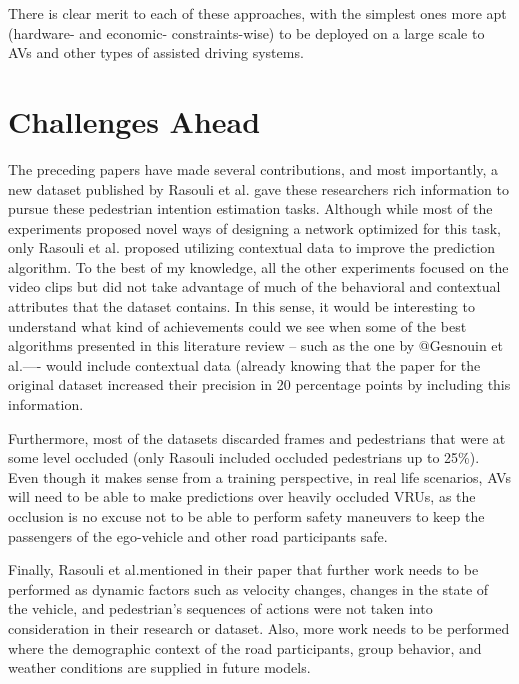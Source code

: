 \documentclass[journal,letterpaper]{IEEEtran}
\begin{document}
There is clear merit to each of these approaches, with the simplest ones more apt (hardware- and economic- constraints-wise) to be deployed on a large scale to AVs and other types of assisted driving systems.
\section{Challenges Ahead}\label{sec:challenges}
The preceding papers have made several contributions, and most importantly, a new dataset published by Rasouli et al. gave these researchers rich information to pursue these pedestrian intention estimation tasks. Although while most of the experiments proposed novel ways of designing a network optimized for this task, only Rasouli et al. proposed utilizing contextual data to improve the prediction algorithm. To the best of my knowledge, all the other experiments focused on the video clips but did not take advantage of much of the behavioral and contextual attributes that the dataset contains. In this sense, it would be interesting to understand what kind of achievements could we see when some of the best algorithms presented in this literature review -- such as the one by @Gesnouin et al.---- would include contextual data (already knowing that the paper for the original dataset increased their precision in 20 percentage points by including this information.

Furthermore, most of the datasets discarded frames and pedestrians that were at some level occluded (only Rasouli included occluded pedestrians up to 25\%). Even though it makes sense from a training perspective, in real life scenarios, AVs will need to be able to make predictions over heavily occluded VRUs, as the occlusion is no excuse not to be able to perform safety maneuvers to keep the passengers of the ego-vehicle and other road participants safe.

Finally, Rasouli et al.mentioned in their paper that further work needs to be performed as dynamic factors such as velocity changes, changes in the state of the vehicle, and pedestrian's sequences of actions were not taken into consideration in their research or dataset. Also, more work needs to be performed where the demographic context of the road participants, group behavior, and weather conditions are supplied in future models.
\end{document}
